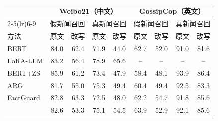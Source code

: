 \begin{tabular}{lcccccccc}
\toprule
 & \multicolumn{4}{c}{Weibo21（中文）} & \multicolumn{4}{c}{GossipCop（英文）} \\
\cmidrule(lr){2-5}\cmidrule(lr){6-9}
 & \multicolumn{2}{c}{假新闻召回} & \multicolumn{2}{c}{真新闻召回} & \multicolumn{2}{c}{假新闻召回} & \multicolumn{2}{c}{真新闻召回} \\
方法 & 原文 & 改写 & 原文 & 改写 & 原文 & 改写 & 原文 & 改写 \\
\midrule
BERT & 84.0 & 62.4 & 71.9 & 44.0 & 62.7 & 52.0 & 91.0 & 81.6 \\
LoRA-LLM & 83.2 & 56.4 & 78.9 & 65.6 & -- & -- & -- & -- \\
BERT+ZS & 85.9 & 61.2 & 73.4 & 47.9 & 58.4 & 48.1 & 93.9 & 86.4 \\
ARG & 81.7 & 55.0 & 75.3 & 49.4 & 60.4 & 49.4 & 92.5 & 83.3 \\
FactGuard & 82.8 & 63.3 & 72.5 & 48.0 & 62.2 & 54.7 & 91.8 & 85.6 \\
\method{} & 82.6 & 53.3 & 75.1 & 54.5 & 63.9 & 52.9 & 92.1 & 85.6 \\
\bottomrule
\end{tabular}
